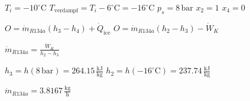 \( T_i = -10^\circ \text{C} \)  
\( T_{\text{verdampf}} = T_i - 6^\circ \text{C} = -16^\circ \text{C} \)  
\( p_s = 8 \, \text{bar} \)  
\( x_2 = 1 \)  
\( x_4 = 0 \)  

\( O = \dot{m}_{R134a} (h_3 - h_4) + \dot{Q}_{\text{ice}} \)  
\( O = \dot{m}_{R134a} (h_2 - h_3) - \dot{W}_K \)  

\( \dot{m}_{R134a} = \frac{\dot{W}_K}{h_2 - h_3} \)  

\( h_3 = h(8 \, \text{bar}) = 264.15 \, \frac{\text{kJ}}{\text{kg}} \)  
\( h_2 = h(-16^\circ \text{C}) = 237.74 \, \frac{\text{kJ}}{\text{kg}} \)  

\( \dot{m}_{R134a} = 3.8167 \, \frac{\text{kg}}{\text{h}} \)